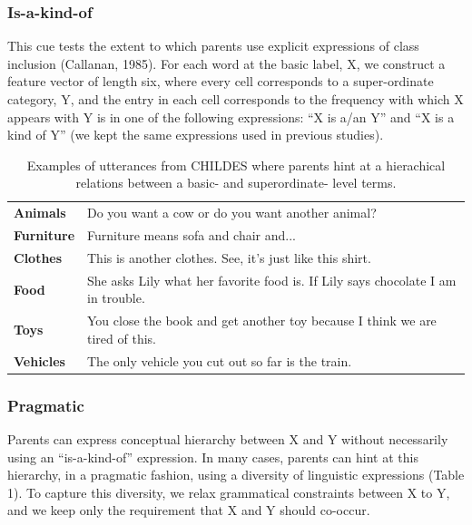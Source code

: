 \documentclass[10pt, letterpaper]{article}
\begin{document}
\hypertarget{is-a-kind-of}{%
\subsubsection{Is-a-kind-of}\label{is-a-kind-of}}

This cue tests the extent to which parents use explicit expressions of
class inclusion (Callanan, 1985). For each word at the basic label, X,
we construct a feature vector of length six, where every cell
corresponds to a super-ordinate category, Y, and the entry in each cell
corresponds to the frequency with which X appears with Y is in one of
the following expressions: ``X is a/an Y'' and ``X is a kind of Y'' (we
kept the same expressions used in previous studies).

\begin{table}[!htbp] \centering 
\begin{tabular}{l p{}}
\hline

\textbf{Animals} & Do you want a cow or do you want another animal?\\

\textbf{Furniture} & Furniture means sofa and chair and...\\

\textbf{Clothes} & This is another clothes. See, it's just like this shirt.\\

\textbf{Food}   & She asks Lily what her favorite food is. If Lily says chocolate I am in trouble. \\

\textbf{Toys} & You close the book and get another toy because I think we are tired of this.\\

\textbf{Vehicles} & The only vehicle you cut out so far is the train.\\

\hline
\end{tabular}
\caption{\label{tab:pragmatic} Examples of utterances from CHILDES where parents hint at a hierachical relations between a basic- and superordinate- level terms.}
\end{table}

\hypertarget{pragmatic}{%
\subsubsection{Pragmatic}\label{pragmatic}}

Parents can express conceptual hierarchy between X and Y without
necessarily using an ``is-a-kind-of'' expression. In many cases, parents
can hint at this hierarchy, in a pragmatic fashion, using a diversity of
linguistic expressions (Table 1). To capture this diversity, we relax
grammatical constraints between X to Y, and we keep only the requirement
that X and Y should co-occur.
\end{document}
